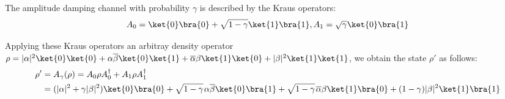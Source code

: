      The amplitude damping channel with probability $\gamma$ is described by the Kraus operators:
\begin{equation*}
     A_{0}= \ket{0} \bra{0} + \sqrt{1-\gamma} \ket{1} \bra{1} ,  A_{1}= \sqrt{\gamma} \ket{0} \bra{1}
\end{equation*}

Applying these Kraus operators an arbitray density operator $\rho=|\alpha|^{2} \ket{0} \ket{0} + \alpha \overline{\beta} \ket{0} \ket{1} + \overline{\alpha} \beta \ket{1} \ket{0} + |\beta|^{2} \ket{1} \ket{1}$, we obtain the state $\rho'$ as follows:
\begin{align*}
     \rho' & = A_\gamma(\rho) =  A_{0} \rho A_{0}^{\dag} + A_{1} \rho A_{1}^{\dag} \\
     & = (|\alpha|^{2} + \gamma |\beta|^{2}) \ket{0}\bra{0} + \sqrt{1-\gamma} \hspace{1pt} \alpha \overline{\beta} \ket{0}\bra{1} + \sqrt{1-\gamma} \hspace{1pt} \overline{\alpha} \beta \ket{1}\bra{0} + (1-\gamma) |\beta|^{2} \ket{1}\bra{1}
\end{align*}

